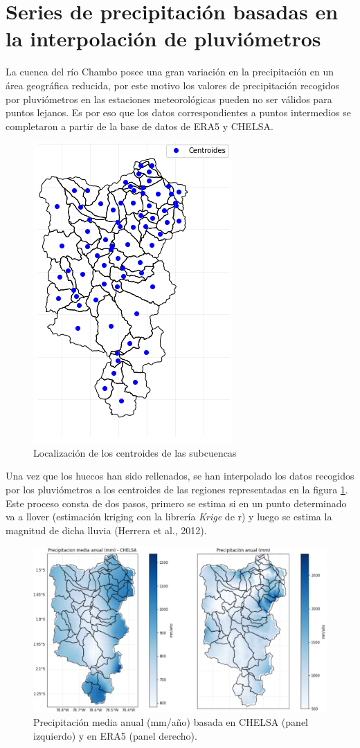 \section{Series de precipitación basadas en la interpolación de pluviómetros}
\label{seriespluv}
La cuenca del río Chambo posee una gran variación en la precipitación en un área geográfica reducida,
por este motivo los valores de precipitación recogidos por pluviómetros en las estaciones meteorológicas 
pueden no ser válidos para puntos lejanos. Es por eso que los datos correspondientes a puntos intermedios se 
completaron a partir de la base de datos de ERA5 y CHELSA.
\begin{figure}[h!]
  \begin{center}
    \includegraphics[height=3.in]{Figures/centroides.png}
    \caption{ Localización de los centroides de las subcuencas}
    \label{0}
  \end{center}
\end{figure}

 Una vez que los huecos han sido rellenados, se han interpolado los datos recogidos por los pluviómetros a los centroides 
 de las regiones  representadas en la figura \ref{0}. Este proceso consta de dos pasos, primero se estima si en un punto 
 determinado va a llover (estimación kriging con la librería \textit{Krige} de r) y luego se estima la magnitud de dicha 
 lluvia (Herrera et al., 2012).

 \begin{figure}[h!]
  \begin{center}
    \includegraphics[height=3.in]{Figures/CHELSA_ERA5.jpg}
    \caption{ Precipitación media anual (mm/año) basada en CHELSA (panel izquierdo) y en ERA5 (panel derecho).}
    \label{1}
  \end{center}
\end{figure}


